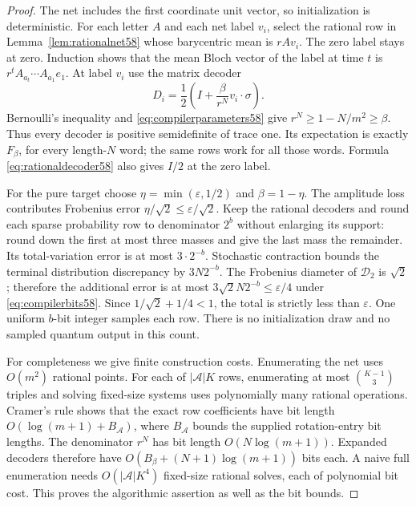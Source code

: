 \begin{proof}
The net includes the first coordinate unit vector, so initialization is
deterministic. For each letter $A$ and each net label $v_i$, select the
rational row in Lemma~\ref{lem:rationalnet58} whose barycentric mean is
$rAv_i$. The zero label stays at zero. Induction shows that the mean
Bloch vector of the label at time $t$ is $r^t A_{a_t}\cdots A_{a_1}e_1$.
At label $v_i$ use the matrix decoder
\begin{equation}\label{eq:rationaldecoder58}
                   D_i=\frac12\left(I+\frac{\beta}{r^N}
                                                   v_i\cdot\sigma\right).
\end{equation}
Bernoulli's inequality and \eqref{eq:compilerparameters58} give
$r^N\ge1-N/m^2\ge\beta$. Thus every decoder is positive semidefinite
of trace one. Its expectation is exactly $F_\beta$, for every length-$N$
word; the same rows work for all those words. Formula
\eqref{eq:rationaldecoder58} also gives $I/2$ at the zero label.

For the pure target choose $\eta=\min(\varepsilon,1/2)$ and
$\beta=1-\eta$. The amplitude loss contributes Frobenius error
$\eta/\sqrt2\le\varepsilon/\sqrt2$. Keep the rational decoders and
round each sparse probability row to denominator $2^b$ without enlarging
its support: round down the first at most three masses and give the last
mass the remainder. Its total-variation error is at most $3\cdot2^{-b}$.
Stochastic contraction bounds the terminal distribution discrepancy by
$3N2^{-b}$. The Frobenius diameter of $\mathcal D_2$ is $\sqrt2$;
therefore the additional error is at most
$3\sqrt2 N2^{-b}\le\varepsilon/4$ under
\eqref{eq:compilerbits58}. Since $1/\sqrt2+1/4<1$, the total is strictly
less than $\varepsilon$. One uniform $b$-bit integer samples each row.
There is no initialization draw and no sampled quantum output in this
count.

For completeness we give finite construction costs. Enumerating the net
uses $O(m^2)$ rational points. For each of $|\mathcal A|K$ rows,
enumerating at most $\binom{K-1}{3}$ triples and solving fixed-size
systems uses polynomially many rational operations. Cramer's rule shows
that the exact row coefficients have bit length
$O(\log(m+1)+B_{\mathcal A})$, where $B_{\mathcal A}$ bounds the supplied
rotation-entry bit lengths. The denominator $r^N$ has bit length
$O(N\log(m+1))$. Expanded decoders therefore have
$O(B_\beta+(N+1)\log(m+1))$ bits each. A naive full enumeration needs
$O(|\mathcal A|K^4)$ fixed-size rational solves, each of polynomial bit
cost. This proves the algorithmic assertion as well as the bit bounds.
\end{proof}
